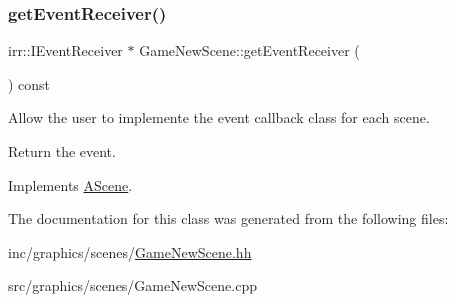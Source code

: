 \subsubsection{\texorpdfstring{get\+Event\+Receiver()}{getEventReceiver()}}
{\footnotesize\ttfamily irr\+::\+I\+Event\+Receiver $\ast$ Game\+New\+Scene\+::get\+Event\+Receiver (\begin{DoxyParamCaption}{ }\end{DoxyParamCaption}) const\hspace{0.3cm}{\ttfamily [virtual]}}



Allow the user to implemente the event callback class for each scene. 

Return the event. 

Implements \hyperlink{classAScene_af521e5e6d30a5d2e5d30eb333e4d3abd}{A\+Scene}.



The documentation for this class was generated from the following files\+:\begin{DoxyCompactItemize}
\item 
inc/graphics/scenes/\hyperlink{GameNewScene_8hh}{Game\+New\+Scene.\+hh}\item 
src/graphics/scenes/Game\+New\+Scene.\+cpp\end{DoxyCompactItemize}
